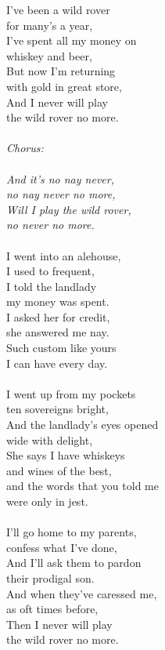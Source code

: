 \documentclass[a5paper]{article}
\begin{document}
I've been a wild rover \\
for many's a year,\\
I've spent all my money on \\
whiskey and beer,\\
But now I'm returning \\
with gold in great store,\\
And I never will play \\
the wild rover no more.\\
\\
\textit{Chorus:\\
\\
And it's no nay never, \\
no nay never no more,\\
Will I play the wild rover,\\
no never no more.\\}
\\
I went into an alehouse, \\
I used to frequent,\\
I told the landlady\\
my money was spent.\\
I asked her for credit, \\
she answered me nay.\\
Such custom like yours \\
I can have every day.\\
\\
I went up from my pockets\\
ten sovereigns bright,\\
And the landlady's eyes opened \\
wide with delight,\\
She says I have whiskeys \\
and wines of the best,\\
and the words that you told me\\
 were only in jest.\\
\\
I'll go home to my parents, \\
confess what I've done,\\
And I'll ask them to pardon \\
their prodigal son.\\
And when they've caressed me, \\
as oft times before,\\
Then I never will play \\
the wild rover no more. 

\newpage

\end{document}
